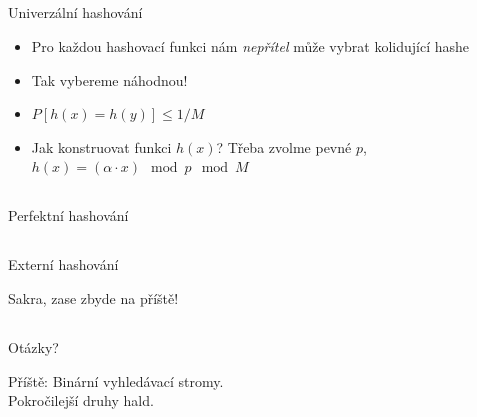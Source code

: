 \documentclass{beamer}
\begin{document}
\subsection{}
\begin{frame}{Univerzální hashování}
\begin{itemize}
\item Pro každou hashovací funkci nám {\em nepřítel} může vybrat kolidující hashe
\item Tak vybereme náhodnou!
\item $P[h(x) = h(y)] \le 1/M$
\item Jak konstruovat funkci $h(x)$? Třeba zvolme pevné $p$, $h(x) = (\alpha \cdot x) \mod p \mod M$
\end{itemize}
\end{frame}

\subsection{}
\begin{frame}{Perfektní hashování}
\end{frame}

\subsection{}
\begin{frame}{Externí hashování}
\begin{center}
Sakra, zase zbyde na příště!
\end{center}
\end{frame}

\subsection{}
\begin{frame}{Otázky?}
\begin{center}
Příště: Binární vyhledávací stromy. \\ Pokročilejší druhy hald.
\end{center}
\end{frame}
\end{document}
